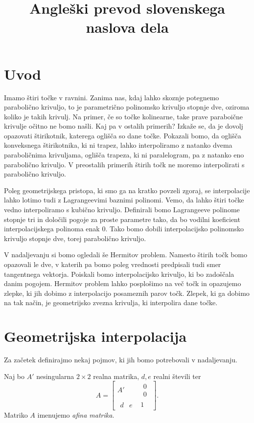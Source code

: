 \documentclass[mat1]{fmfdelo}
\title{Angleški prevod slovenskega naslova dela}
\begin{document}
\section{Uvod}

Imamo štiri točke v ravnini. Zanima nas, kdaj lahko skoznje potegnemo parabolično krivuljo, to je parametrično polinomsko krivuljo stopnje dve, oziroma koliko je takih krivulj. Na primer, če so točke kolinearne, take prave paraboične krivulje očitno ne bomo našli. Kaj pa v ostalih primerih? Izkaže se, da je dovolj opazovati štirikotnik, katerega oglišča so dane točke. Pokazali bomo, da oglišča konveksnega štirikotnika, ki ni trapez, lahko interpoliramo z natanko dvema paraboličnima krivuljama, oglišča trapeza, ki ni paralelogram, pa z natanko eno parabolično krivuljo. V preostalih primerih štirih točk ne moremo interpolirati s parabolično krivuljo.

Poleg geometrijskega pristopa, ki smo ga na kratko povzeli zgoraj, se interpolacije lahko lotimo tudi z Lagrangeevimi baznimi polinomi. Vemo, da lahko štiri točke vedno interpoliramo s kubično krivuljo. Definirali bomo Lagrangeeve polinome stopnje tri in določili pogoje za proste parametre tako, da bo vodilni koeficient interpolacijskega polinoma enak $0$. Tako bomo dobili interpolacijsko polinomsko krivuljo stopnje dve, torej parabolično krivuljo.

V nadaljevanju si bomo ogledali še Hermitov problem. Namesto štirih točk bomo opazovali le dve, v katerih pa bomo poleg vrednosti predpisali tudi smer tangentnega vektorja. Poiskali bomo interpolacijsko krivuljo, ki bo zadoščala danim pogojem. Hermitov problem lahko posplošimo na več točk in opazujemo zlepke, ki jih dobimo z interpolacijo posameznih parov točk. Zlepek, ki ga dobimo na tak način, je geometrijsko zvezna krivulja, ki interpolira dane točke. 

\section{Geometrijska interpolacija}

Za začetek definirajmo nekaj pojmov, ki jih bomo potrebovali v nadaljevanju.

\begin{definicija}
Naj bo $A'$ nesingularna $2\times2$ realna matrika, $d, e$ realni števili ter 
$$ A = 
\begin{bmatrix}
A' &
\begin{matrix}
0 \\
0
\end{matrix}
\\
\begin{matrix}
d & e
\end{matrix}
 & 1
\end{bmatrix}
.$$
Matriko $A$ imenujemo \emph{afina matrika}. 
\end{definicija}
\end{document}
